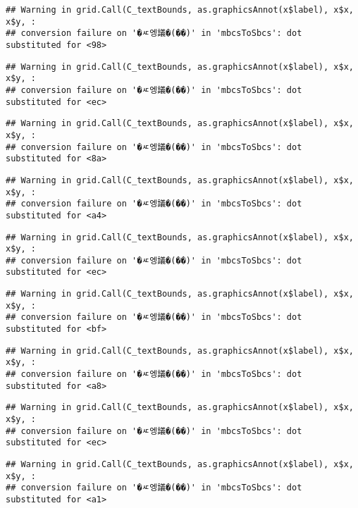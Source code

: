 \documentclass[
]{article}
\begin{document}
\begin{verbatim}
## Warning in grid.Call(C_textBounds, as.graphicsAnnot(x$label), x$x, x$y, :
## conversion failure on '�ㅼ엥議�(��)' in 'mbcsToSbcs': dot substituted for <98>
\end{verbatim}

\begin{verbatim}
## Warning in grid.Call(C_textBounds, as.graphicsAnnot(x$label), x$x, x$y, :
## conversion failure on '�ㅼ엥議�(��)' in 'mbcsToSbcs': dot substituted for <ec>
\end{verbatim}

\begin{verbatim}
## Warning in grid.Call(C_textBounds, as.graphicsAnnot(x$label), x$x, x$y, :
## conversion failure on '�ㅼ엥議�(��)' in 'mbcsToSbcs': dot substituted for <8a>
\end{verbatim}

\begin{verbatim}
## Warning in grid.Call(C_textBounds, as.graphicsAnnot(x$label), x$x, x$y, :
## conversion failure on '�ㅼ엥議�(��)' in 'mbcsToSbcs': dot substituted for <a4>
\end{verbatim}

\begin{verbatim}
## Warning in grid.Call(C_textBounds, as.graphicsAnnot(x$label), x$x, x$y, :
## conversion failure on '�ㅼ엥議�(��)' in 'mbcsToSbcs': dot substituted for <ec>
\end{verbatim}

\begin{verbatim}
## Warning in grid.Call(C_textBounds, as.graphicsAnnot(x$label), x$x, x$y, :
## conversion failure on '�ㅼ엥議�(��)' in 'mbcsToSbcs': dot substituted for <bf>
\end{verbatim}

\begin{verbatim}
## Warning in grid.Call(C_textBounds, as.graphicsAnnot(x$label), x$x, x$y, :
## conversion failure on '�ㅼ엥議�(��)' in 'mbcsToSbcs': dot substituted for <a8>
\end{verbatim}

\begin{verbatim}
## Warning in grid.Call(C_textBounds, as.graphicsAnnot(x$label), x$x, x$y, :
## conversion failure on '�ㅼ엥議�(��)' in 'mbcsToSbcs': dot substituted for <ec>
\end{verbatim}

\begin{verbatim}
## Warning in grid.Call(C_textBounds, as.graphicsAnnot(x$label), x$x, x$y, :
## conversion failure on '�ㅼ엥議�(��)' in 'mbcsToSbcs': dot substituted for <a1>
\end{verbatim}
\end{document}
